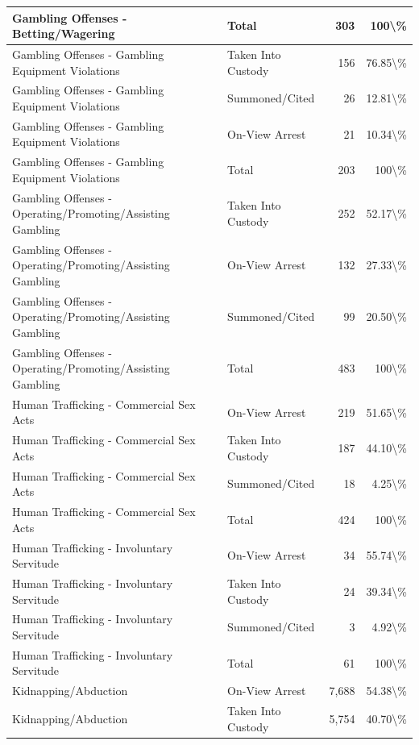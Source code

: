 \documentclass[
]{krantz}
\begin{document}
\begin{longtable}[t]{l|l|r|r}
\hline
Gambling Offenses - Betting/Wagering & Total & 303 & 100\textbackslash{}\%\\
\hline
Gambling Offenses - Gambling Equipment Violations & Taken Into Custody & 156 & 76.85\textbackslash{}\%\\
\hline
Gambling Offenses - Gambling Equipment Violations & Summoned/Cited & 26 & 12.81\textbackslash{}\%\\
\hline
Gambling Offenses - Gambling Equipment Violations & On-View Arrest & 21 & 10.34\textbackslash{}\%\\
\hline
Gambling Offenses - Gambling Equipment Violations & Total & 203 & 100\textbackslash{}\%\\
\hline
Gambling Offenses - Operating/Promoting/Assisting Gambling & Taken Into Custody & 252 & 52.17\textbackslash{}\%\\
\hline
Gambling Offenses - Operating/Promoting/Assisting Gambling & On-View Arrest & 132 & 27.33\textbackslash{}\%\\
\hline
Gambling Offenses - Operating/Promoting/Assisting Gambling & Summoned/Cited & 99 & 20.50\textbackslash{}\%\\
\hline
Gambling Offenses - Operating/Promoting/Assisting Gambling & Total & 483 & 100\textbackslash{}\%\\
\hline
Human Trafficking - Commercial Sex Acts & On-View Arrest & 219 & 51.65\textbackslash{}\%\\
\hline
Human Trafficking - Commercial Sex Acts & Taken Into Custody & 187 & 44.10\textbackslash{}\%\\
\hline
Human Trafficking - Commercial Sex Acts & Summoned/Cited & 18 & 4.25\textbackslash{}\%\\
\hline
Human Trafficking - Commercial Sex Acts & Total & 424 & 100\textbackslash{}\%\\
\hline
Human Trafficking - Involuntary Servitude & On-View Arrest & 34 & 55.74\textbackslash{}\%\\
\hline
Human Trafficking - Involuntary Servitude & Taken Into Custody & 24 & 39.34\textbackslash{}\%\\
\hline
Human Trafficking - Involuntary Servitude & Summoned/Cited & 3 & 4.92\textbackslash{}\%\\
\hline
Human Trafficking - Involuntary Servitude & Total & 61 & 100\textbackslash{}\%\\
\hline
Kidnapping/Abduction & On-View Arrest & 7,688 & 54.38\textbackslash{}\%\\
\hline
Kidnapping/Abduction & Taken Into Custody & 5,754 & 40.70\textbackslash{}\%\\

\end{longtable}
\end{document}
